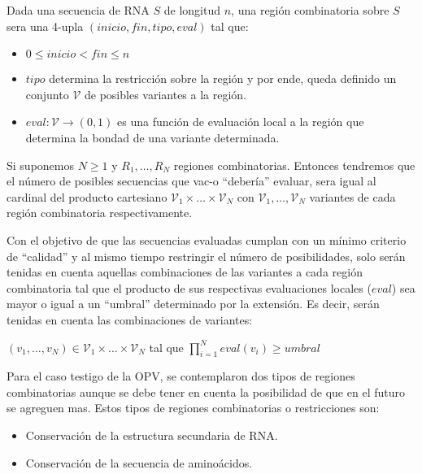 \begin{definition}
\label{region}
Dada una secuencia de \ac{RNA} $S$ de longitud $n$, una regi\'on combinatoria
sobre $S$ sera una 4-upla $(inicio, fin, tipo, eval)$ tal que:
\begin{itemize}
 \item $0 \le inicio < fin \le n$
 \item $tipo$ determina la restricci\'on sobre la regi\'on y por ende, queda
definido un conjunto $\mathcal{V}$ de posibles variantes a la regi\'on.
 \item $eval: \mathcal{V} \rightarrow (0,1)$ es una funci\'on de evaluaci\'on
local a la regi\'on que determina la bondad de una variante determinada.
\end{itemize}
\end{definition}

Si suponemos $N \ge 1$ y $R_{1}, \dots, R_{N}$ regiones combinatorias.
Entonces tendremos que el n\'umero de posibles secuencias que \ac{vac-o}
``deber\'ia'' evaluar, sera igual al cardinal del producto cartesiano
$\mathcal{V}_{1} \times \dots \times \mathcal{V}_{N}$ con  $\mathcal{V}_{1},
\dots, \mathcal{V}_{N}$ variantes de cada regi\'on combinatoria respectivamente.

Con el objetivo de que las secuencias evaluadas cumplan con un m\'inimo criterio
de ``calidad'' y al mismo tiempo restringir el n\'umero de posibilidades, solo
ser\'an tenidas en cuenta aquellas combinaciones de las variantes a cada
regi\'on combinatoria tal que el producto de sus respectivas evaluaciones
locales ($eval$) sea mayor o igual a un ``umbral'' determinado por la
extensi\'on. Es decir, ser\'an tenidas en cuenta las combinaciones de variantes:
\begin{center}
$(v_{1},\dots, v_{N}) \in \mathcal{V}_{1} \times \dots \times \mathcal{V}_{N}$
tal que $\prod_{i=1}^{N} eval(v_{i}) \ge umbral$ 
\end{center}

Para el caso testigo de la \ac{OPV}, se contemplaron dos tipos de regiones
combinatorias aunque se debe tener en cuenta la posibilidad de que en el futuro
se agreguen mas. Estos tipos de regiones combinatorias o restricciones son:
\begin{itemize}
 \item Conservaci\'on de la estructura secundaria de \ac{RNA}.
 \item Conservaci\'on de la secuencia de amino\'acidos.
\end{itemize}

